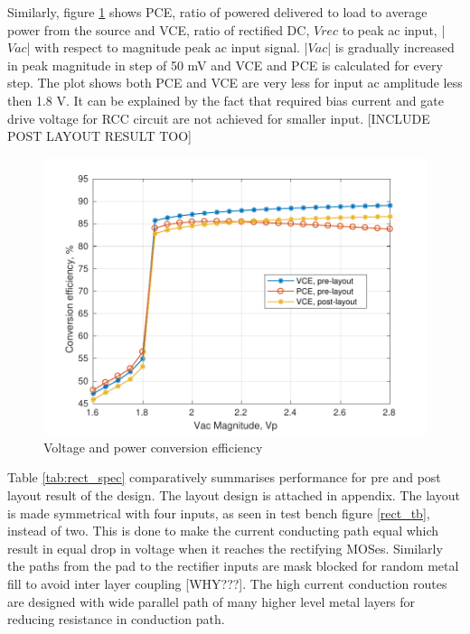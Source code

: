 \documentclass[12pt,a4paper,UKenglish]{article}
\begin{document}
Similarly, figure  \ref{rect_ce} shows PCE, ratio of powered delivered to load to average power from the source and 
VCE, ratio of rectified DC, $Vrec$ to peak ac input, |$Vac$| with respect to magnitude peak ac input signal. |$Vac$| is gradually increased in 
peak magnitude in step of 50 mV and VCE and PCE is calculated for every step. The plot shows both 
PCE and VCE are very less for input ac amplitude less then 1.8 V. It can be explained by the fact that required 
bias current and gate drive voltage for RCC circuit are not achieved for smaller input. [INCLUDE POST LAYOUT RESULT TOO] \\

\begin{figure}[htbp] %
   \centering
   \includegraphics[width=\textwidth]{img/rectifier_ce.pdf} 
   \caption{Voltage and power conversion efficiency}
   \label{rect_ce}
\end{figure}

Table \ref{tab:rect_spec} comparatively summarises performance for pre and post layout result of the design. The layout design is attached in appendix. The layout 
is made symmetrical with four inputs, as seen in test bench figure \ref{rect_tb}, instead of two. This is done to make the current conducting path equal which result in 
equal drop in voltage when it reaches the rectifying MOSes. Similarly the paths from the pad to the rectifier inputs are mask blocked for random metal fill to avoid 
inter layer coupling [WHY???]. The high current conduction routes are designed with wide parallel path of many higher level metal layers for reducing resistance in conduction path.
\end{document}
